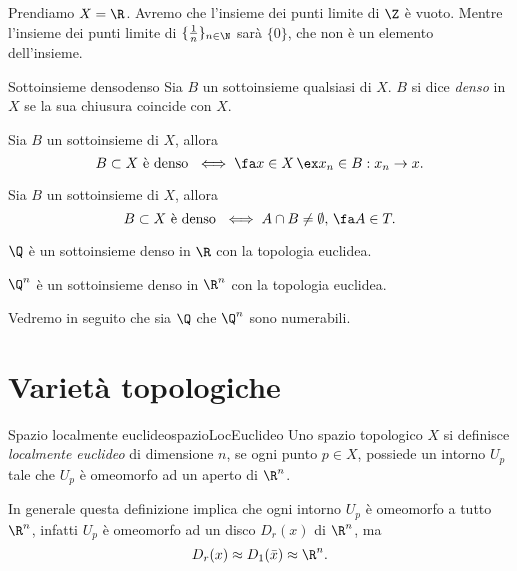 \begin{ese}
	Prendiamo \(X=\R\).
	Avremo che l'insieme dei punti limite di \(\Z\) è vuoto.
	Mentre l'insieme dei punti limite di \(\{\frac{1}{n}\}_{n\in\N}\) sarà \(\{0\}\), che non è un elemento dell'insieme.
\end{ese}

\begin{defn}{Sottoinsieme denso}{denso}
	Sia \(B\) un sottoinsieme qualsiasi di \(X\).
	\(B\) si dice \emph{denso} in \(X\) se la sua chiusura coincide con \(X\).
\end{defn}

\begin{pr}
	Sia \(B\) un sottoinsieme di \(X\), allora
	\[
		B\subset X\text{ è denso }\iff\fa x \in X\,\ex x_n \in B : x_n \to x.
	\]
\end{pr}

\begin{pr}
	Sia \(B\) un sottoinsieme di \(X\), allora
	\[
		B\subset X\text{ è denso }\iff A\cap B\neq\emptyset,\,\fa A\in T.
	\]
\end{pr}

\begin{ese}
	\(\Q\) è un sottoinsieme denso in \(\R\) con la topologia euclidea.
\end{ese}

\begin{ese}
	\(\Q^n\) è un sottoinsieme denso in \(\R^n\) con la topologia euclidea.
\end{ese}

\begin{oss}
	Vedremo in seguito che sia \(\Q\) che \(\Q^n\) sono numerabili.
\end{oss}
\section{Varietà topologiche}

\begin{defn}{Spazio localmente euclideo}{spazioLocEuclideo}
	Uno spazio topologico \(X\) si definisce \emph{localmente euclideo} di dimensione \(n\), se ogni punto \(p\in X\), possiede un intorno \(U_p\) tale che \(U_p\) è omeomorfo ad un aperto di \(\R^n\).
\end{defn}

\begin{oss}
	In generale questa definizione implica che ogni intorno \(U_p\) è omeomorfo a tutto \(\R^n\), infatti \(U_p\) è omeomorfo ad un disco \(D_r(x)\) di \(\R^n\), ma
	\[
		D_r(x)\approx D_1(\bar{x})\approx \R^n.
	\]
\end{oss}


